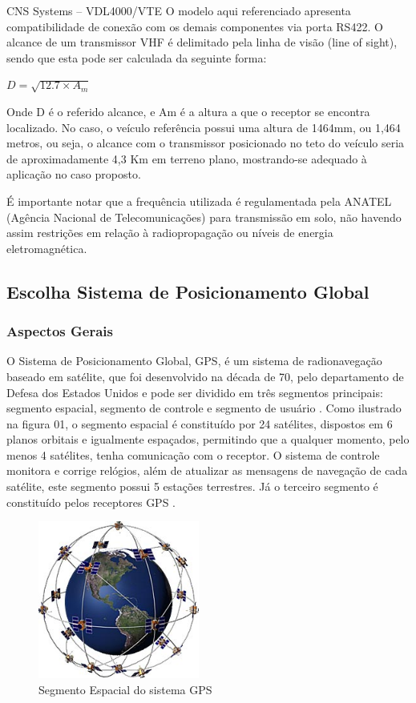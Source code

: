 CNS Systems – VDL4000/VTE \cite{datasheet_transponder}
O modelo aqui referenciado apresenta compatibilidade de conexão com os demais
componentes via porta RS422. O alcance de um transmissor VHF é delimitado pela
 linha de visão (line of sight), sendo que esta pode ser calculada da seguinte
 forma:

 $ D = \sqrt{12.7 \times A_{m}} $

 Onde D é o referido alcance, e Am é a altura a que o receptor se encontra
 localizado. No caso, o veículo referência possui uma altura de 1464mm, ou
 1,464 metros, ou seja, o alcance com o transmissor posicionado no teto do
 veículo seria de aproximadamente 4,3 Km em terreno plano, mostrando-se
 adequado à aplicação no caso proposto.

 É importante notar que a frequência utilizada é regulamentada pela ANATEL
 (Agência Nacional de Telecomunicações) para transmissão em solo, não havendo
  assim restrições em relação à radiopropagação ou níveis de energia
  eletromagnética.

\subsection{Escolha Sistema de Posicionamento Global}


\subsubsection{Aspectos Gerais}

O Sistema de Posicionamento Global, GPS, é um sistema de radionavegação
baseado em satélite, que foi desenvolvido na década de 70, pelo departamento
de Defesa dos Estados Unidos e pode ser dividido em três segmentos principais:
segmento espacial, segmento de controle e segmento de usuário \cite{interferidores_gps}.
Como ilustrado na figura 01, o segmento espacial é constituído por
24 satélites, dispostos em 6 planos orbitais e igualmente espaçados,
permitindo que a qualquer momento, pelo menos 4 satélites, tenha
comunicação com o receptor. O sistema de controle monitora e corrige
relógios, além de atualizar as mensagens de navegação de cada satélite,
este segmento possui 5 estações terrestres. Já o terceiro segmento é
constituído pelos receptores GPS \cite{posicionamento_gnss}.

\begin{figure}[h]
  \centering
  \includegraphics[width=200px, scale=1]{figuras/esquema_gps}
  \caption{Segmento Espacial do sistema GPS \cite{entendendo_gps}}
\label{fig:esquema_gps}
\end{figure}

